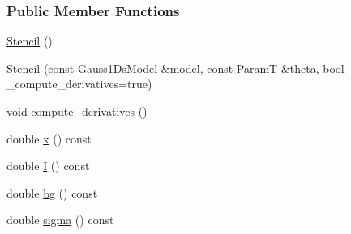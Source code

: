 \subsubsection*{Public Member Functions}
\begin{DoxyCompactItemize}
\item 
\hyperlink{classmappel_1_1Gauss1DsModel_1_1Stencil_a7d151d646b8286c83a3c6e5b49b1a66d}{Stencil} ()
\item 
\hyperlink{classmappel_1_1Gauss1DsModel_1_1Stencil_ae4f12261a80d8ed1a2d3652c0e7b629b}{Stencil} (const \hyperlink{classmappel_1_1Gauss1DsModel}{Gauss1\+Ds\+Model} \&\hyperlink{classmappel_1_1Gauss1DsModel_1_1Stencil_aea5b9e51d1fc6471820598c321472bfe}{model}, const \hyperlink{classmappel_1_1Gauss1DsModel_1_1Stencil_adaba50464646fb95c5853b5c15365ed2}{ParamT} \&\hyperlink{classmappel_1_1Gauss1DsModel_1_1Stencil_ab1acb6728b521c0ba62d06bc9a92ae79}{theta}, bool \+\_\+compute\+\_\+derivatives=true)
\item 
void \hyperlink{classmappel_1_1Gauss1DsModel_1_1Stencil_a9e8b6059b84e28bea0ba3496bc95e7ce}{compute\+\_\+derivatives} ()
\item 
double \hyperlink{classmappel_1_1Gauss1DsModel_1_1Stencil_a58c751f2db27f365454fda0db3bfcd1a}{x} () const 
\item 
double \hyperlink{classmappel_1_1Gauss1DsModel_1_1Stencil_a29ce270778228bbf34c3bb995f7fa3b6}{I} () const 
\item 
double \hyperlink{classmappel_1_1Gauss1DsModel_1_1Stencil_a02181effe22edf10cdd2dea3bf766a1b}{bg} () const 
\item 
double \hyperlink{classmappel_1_1Gauss1DsModel_1_1Stencil_a91366bc87b44318c0ded04ac99760c27}{sigma} () const 
\end{DoxyCompactItemize}
